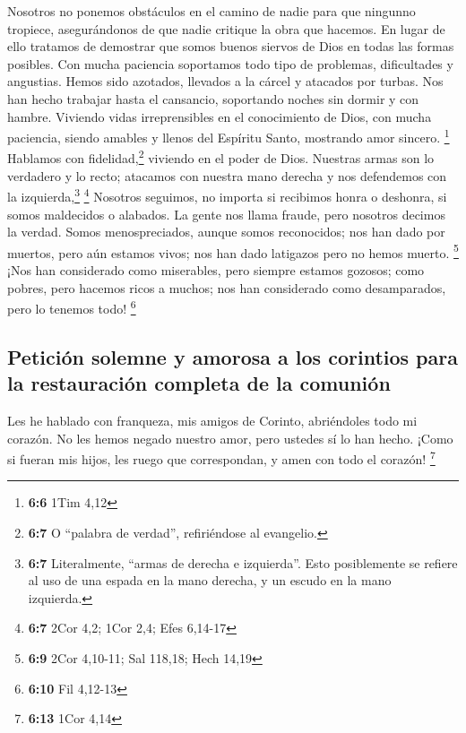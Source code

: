  Nosotros no ponemos obstáculos en el camino de nadie para
que ningunno tropiece, asegurándonos de que nadie critique la obra que
hacemos.  En lugar de ello tratamos de demostrar que somos
buenos siervos de Dios en todas las formas posibles. Con mucha paciencia
soportamos todo tipo de problemas, dificultades y angustias.
 Hemos sido azotados, llevados a la cárcel y atacados por
turbas. Nos han hecho trabajar hasta el cansancio, soportando noches sin
dormir y con hambre.  Viviendo vidas irreprensibles en el
conocimiento de Dios, con mucha paciencia, siendo amables y llenos del
Espíritu Santo, mostrando amor sincero. \footnote{\textbf{6:6} 1Tim 4,12}
 Hablamos con fidelidad,\footnote{\textbf{6:7} O ``palabra
  de verdad'', refiriéndose al evangelio.} viviendo en el poder de Dios.
Nuestras armas son lo verdadero y lo recto; atacamos con nuestra mano
derecha y nos defendemos con la izquierda,\footnote{\textbf{6:7}
  Literalmente, ``armas de derecha e izquierda''. Esto posiblemente se
  refiere al uso de una espada en la mano derecha, y un escudo en la
  mano izquierda.} \footnote{\textbf{6:7} 2Cor 4,2; 1Cor 2,4; Efes
  6,14-17}  Nosotros seguimos, no importa si recibimos
honra o deshonra, si somos maldecidos o alabados. La gente nos llama
fraude, pero nosotros decimos la verdad.  Somos
menospreciados, aunque somos reconocidos; nos han dado por muertos, pero
aún estamos vivos; nos han dado latigazos pero no hemos muerto.
\footnote{\textbf{6:9} 2Cor 4,10-11; Sal 118,18; Hech 14,19}
 ¡Nos han considerado como miserables, pero siempre
estamos gozosos; como pobres, pero hacemos ricos a muchos; nos han
considerado como desamparados, pero lo tenemos todo! \footnote{\textbf{6:10}
  Fil 4,12-13}

\hypertarget{peticiuxf3n-solemne-y-amorosa-a-los-corintios-para-la-restauraciuxf3n-completa-de-la-comuniuxf3n}{%
\subsection{Petición solemne y amorosa a los corintios para la
restauración completa de la
comunión}\label{peticiuxf3n-solemne-y-amorosa-a-los-corintios-para-la-restauraciuxf3n-completa-de-la-comuniuxf3n}}

 Les he hablado con franqueza, mis amigos de Corinto,
abriéndoles todo mi corazón.  No les hemos negado nuestro
amor, pero ustedes sí lo han hecho.  ¡Como si fueran mis
hijos, les ruego que correspondan, y amen con todo el corazón!
\footnote{\textbf{6:13} 1Cor 4,14}

